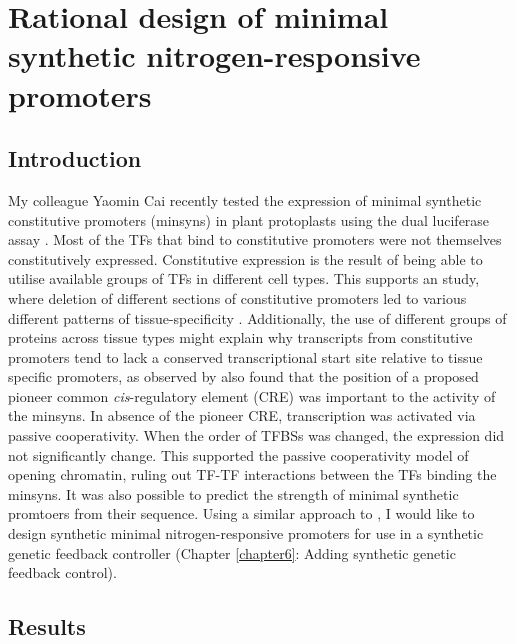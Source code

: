 \documentclass[../main.tex]{subfiles}
\begin{document}
\chapter{Rational design of minimal synthetic nitrogen-responsive promoters}\label{chapter5}
\section{Introduction}\label{chapter5:introduction}
My colleague Yaomin Cai recently tested the expression of minimal synthetic constitutive promoters (minsyns) in plant protoplasts using the dual luciferase assay \autocite{caiRationalDesignMinimal2020}.
Most of the TFs that bind to constitutive promoters were not themselves constitutively expressed.
Constitutive expression is the result of being able to utilise available groups of TFs in different cell types.
This supports an study, where deletion of different sections of constitutive promoters led to various different patterns of tissue-specificity \autocite{benfeyTissuespecificExpressionCaMV1990}.
Additionally, the use of different groups of proteins across tissue types might explain why transcripts from constitutive promoters tend to lack a conserved transcriptional start site relative to tissue specific promoters, as observed by %
\textcite*{caiRationalDesignMinimal2020} also found that the position of a proposed pioneer common \textit{cis}\hyp{}regulatory element (CRE) was important to the activity of the minsyns.
In absence of the pioneer CRE, transcription was activated via passive cooperativity.
When the order of TFBSs was changed, the expression did not significantly change.
This supported the passive cooperativity model of opening chromatin, ruling out TF-TF interactions between the TFs binding the minsyns.
It was also possible to predict the strength of minimal synthetic promtoers from their sequence.
Using a similar approach to \textcite*{caiRationalDesignMinimal2020}, I would like to design synthetic minimal nitrogen-responsive promoters for use in a synthetic genetic feedback controller (Chapter \ref{chapter6}: Adding synthetic genetic feedback control).
\section{Results}\label{chapter5:results}
\end{document}
